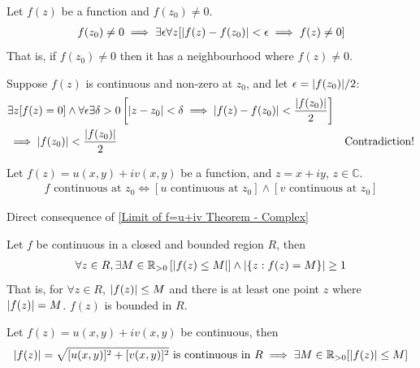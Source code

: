 \documentclass[12pt, english]{book}
\makeatletter
\renewenvironment{proof}[1][\proofname]{\par
	\pushQED{\qed}%
	\normalfont \topsep6\p@\@plus6\p@\relax
	\list{}{%
		\settowidth{\leftmargin}{\itshape\proofname:\hskip\labelsep}%
		\setlength{\labelwidth}{0pt}%
		\setlength{\itemindent}{-\leftmargin}%
	}%
	\item[\hskip\labelsep\itshape#1\@addpunct{:}]\ignorespaces
	}{ \popQED\endlist\@endpefalse}
\makeatother
\begin{document}
	\begin{theorem}
		\label{f(z) neq 0 Neighbourhood Theorem - Complex}
		Let $f(z)$ be a function and $f(z_0) \neq 0$.
		\begin{align*}
			f(z_0) \neq 0 
			\implies \exists \epsilon \forall z [\abs{f(z) - f(z_0)}<\epsilon \implies f(z) \neq 0]
		\end{align*}
		That is, if $f(z_0) \neq 0$ then it has a neighbourhood where $f(z) \neq 0$.
	\end{theorem}
	\begin{proof}
		Suppose $f(z)$ is continuous and non-zero at $z_0$, and let $\epsilon = \abs{f(z_0)}/2$:
		\begin{align*}
			&\exists z [f(z) = 0]  \land 
			\forall \epsilon \exists \delta>0 \left[ \abs{z-z_0}<\delta \implies \abs{f(z) - f(z_0)}  < \frac{\abs{f(z_0)}}{2} \right] & \\
			&\implies \abs{f(z_0)} < \frac{\abs{f(z_0)}}{2} & \text{Contradiction!}
		\end{align*}
	\end{proof}

	\begin{theorem}
		Let $f(z) = u(x,y) + iv(x,y)$ be a function, and $z = x + iy$, $z \in \mathbb{C}$. 
		\begin{align*}
			f \text{ continuous at } z_0 \iff \left[ u \text{ continuous at } z_0 \right] \land \left[ v \text{ continuous at } z_0 \right]
		\end{align*}
		\label{Continuity of f=u+iv Theorem - Complex}
	\end{theorem}
	\begin{proof}
		Direct consequence of \cref{Limit of f=u+iv Theorem - Complex}
	\end{proof}
	
	\begin{theorem}
		\label{Function continuous in closed and bounded region implies function is bounded Theorem - Complex}
		Let $f$ be continuous in a closed and bounded region $R$, then
		\begin{align*}
			\forall z \in R, \exists M \in \mathbb{R}_{>0}  \left[\abs{f(z) \leq M}\right] 
			\land \abs{\{z : f(z) = M \}} \geq 1
		\end{align*}
		That is, for $\forall z \in R$, $\abs{f(z)} \leq M$ and there is at least one point $z$ where $\abs{f(z)}= M$. $f(z)$ is bounded in $R$.
	\end{theorem}
	\begin{proof}
		Let $f(z) = u(x,y) + iv(x,y)$ be continuous, then 
		\begin{align*}
			\abs{f(z)} = \sqrt{[u(x,y)]^2 + [v(x,y)]^2} \text{ is continuous in } R 
			\implies \exists M \in \mathbb{R}_{>0} [\abs{f(z)}\leq M]
		\end{align*}
	\end{proof}
\end{document}
